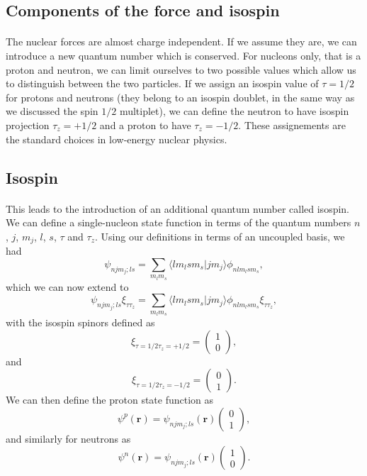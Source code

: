 \documentclass[%
twoside,                 %
final,                   %
10pt]{article}
\begin{document}
\subsection*{Components of the force and isospin}

\paragraph{}
 The nuclear forces are almost charge independent. If we assume they are, 
we can introduce a new quantum number which is conserved. For nucleons only, that is a proton and neutron, we can limit ourselves
to two possible values which allow us to distinguish between the two particles. If we assign an isospin value of $\tau=1/2$ for protons
and neutrons (they belong to an isospin doublet, in the same way as we discussed the spin $1/2$ multiplet), we can define 
the neutron to have isospin projection $\tau_z=+1/2$ and a proton to have $\tau_z=-1/2$. These assignements are the standard choices in low-energy nuclear physics.



\subsection*{Isospin}

\paragraph{}
This leads to the introduction of an additional quantum number called isospin.
We can define a single-nucleon
state function in terms of the quantum numbers $n$, $j$, $m_j$, $l$, $s$, $\tau$ and $\tau_z$. Using our definitions in terms of an uncoupled basis, we had 
\[
\psi_{njm_j;ls}=\sum_{m_lm_s}\langle lm_lsm_s|jm_j\rangle\phi_{nlm_lsm_s},
\]
which we can now extend to
\[
\psi_{njm_j;ls}\xi_{\tau\tau_z}=\sum_{m_lm_s}\langle lm_lsm_s|jm_j\rangle\phi_{nlm_lsm_s}\xi_{\tau\tau_z},
\]
with the isospin spinors defined as 
\[
\xi_{\tau=1/2\tau_z=+1/2}=\left(\begin{array}{c} 1  \\ 0\end{array}\right),
\]
and
\[
\xi_{\tau=1/2\tau_z=-1/2}=\left(\begin{array}{c} 0  \\ 1\end{array}\right).
\]
We can then define the proton state function as 
\[
\psi^p(\mathbf{r})  =\psi_{njm_j;ls}(\mathbf{r})\left(\begin{array}{c} 0  \\ 1\end{array}\right), 
\]
and similarly for neutrons as
\[
\psi^n(\mathbf{r})  =\psi_{njm_j;ls}(\mathbf{r})\left(\begin{array}{c} 1  \\ 0\end{array}\right). 
\]
\end{document}
